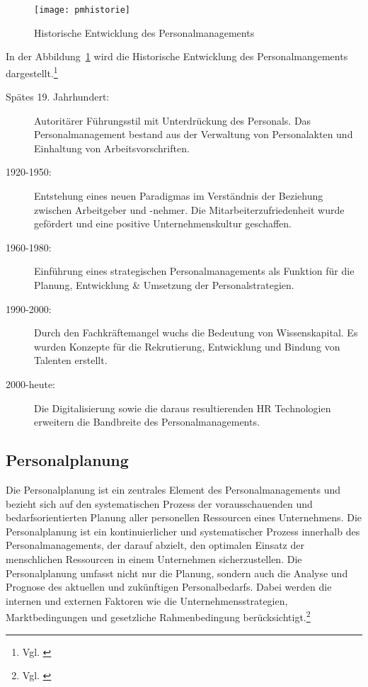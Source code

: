 %

\begin{figure}%
\centering
\texttt{[image: pmhistorie]}
\caption{Historische Entwicklung des Personalmanagements}
\label{fig:pmhistorie}
\end{figure}

In der Abbildung~\ref{fig:pmhistorie} wird die Historische Entwicklung des Personalmangements dargestellt.\footnote{Vgl. \cite{Haufe2016}}

 \begin{description}
\item[Spätes 19. Jahrhundert:] Autoritärer Führungsstil mit Unterdrückung des Personals. Das Personalmanagement bestand aus der Verwaltung von Personalakten und Einhaltung von Arbeitsvorschriften.

\item[1920-1950:] Entstehung eines neuen Paradigmas im Verständnis der Beziehung zwischen Arbeitgeber und -nehmer. Die Mitarbeiterzufriedenheit wurde gefördert und eine positive Unternehmenskultur geschaffen.

\item[1960-1980:] Einführung eines strategischen Personalmanagements als Funktion für die Planung, Entwicklung \& Umsetzung der Personalstrategien.

\item[1990-2000:] Durch den Fachkräftemangel wuchs die Bedeutung von Wissenskapital. Es wurden Konzepte für die Rekrutierung, Entwicklung und Bindung von Talenten erstellt.

\item[2000-heute:] Die Digitalisierung sowie die daraus resultierenden HR Technologien erweitern die Bandbreite des Personalmanagements.

\end{description}

\subsection{Personalplanung}
Die Personalplanung ist ein zentrales Element des Personalmanagements und bezieht sich auf den systematischen Prozess der vorausschauenden und bedarfsorientierten Planung aller personellen Ressourcen eines Unternehmens. Die Personalplanung ist ein kontinuierlicher und systematischer Prozess innerhalb des Personalmanagements, der darauf abzielt, den optimalen Einsatz der menschlichen Ressourcen in einem Unternehmen sicherzustellen. Die Personalplanung umfasst nicht nur die Planung, sondern auch die Analyse und Prognose des aktuellen und zukünftigen Personalbedarfs. Dabei werden die internen und externen Faktoren wie die Unternehmensstrategien, Marktbedingungen und gesetzliche Rahmenbedingung berücksichtigt.\footnote{Vgl. \cite[S. 2-11]{Jahn03:EntwicklungPM}}

